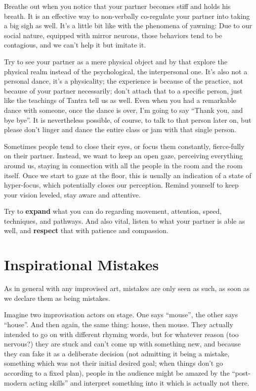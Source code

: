 Breathe out when you notice that your partner becomes stiff and holds his breath.
It is an effective way to non-verbally co-regulate your partner into taking a big sigh as well.
It's a little bit like with the phenomena of yawning: Due to our social nature, equipped with mirror neurons, those behaviors tend to be contagious, and we can't help it but imitate it.

Try to see your partner as a mere physical object and by that explore the physical realm instead of the psychological, the interpersonal one.
It's also not a personal dance, it's a physicality; the experience is because of the practice, not because of your partner necessarily; don't attach that to a specific person, just like the teachings of Tantra tell us as well.
Even when you had a remarkable dance with someone, once the dance is over, I'm going to say ``Thank you, and bye bye''.
It is nevertheless possible, of course, to talk to that person later on, but please don't linger and dance the entire class or jam with that single person.

Sometimes people tend to close their eyes, or focus them constantly, fierce-fully on their partner.
Instead, we want to keep an open gaze, perceiving everything around us, staying in connection with all the people in the room and the room itself.
Once we start to gaze at the floor, this is usually an indication of a state of hyper-focus, which potentially closes our perception.
Remind yourself to keep your vision leveled, stay aware and attentive.

Try to \textbf{expand} what you can do regarding movement, attention, speed, techniques, and pathways.
And also vital, listen to what your partner is able as well, and \textbf{respect} that with patience and compassion.

\section{Inspirational Mistakes}\label{sec:inspirational-mistakes}

As in general with any improvised art, mistakes are only seen as such, as soon as we declare them as being mistakes.

Imagine two improvisation actors on stage.
One says ``mouse'', the other says ``house''.
And then again, the same thing: house, then mouse.
They actually intended to go on with different rhyming words, but for whatever reason (too nervous?) they are stuck and can't come up with something new, and because they can fake it as a deliberate decision (not admitting it being a mistake, something which was not their initial desired goal; when things don't go according to a fixed plan), people in the audience might be amazed by the ``post-modern acting skills'' and interpret something into it which is actually not there.

